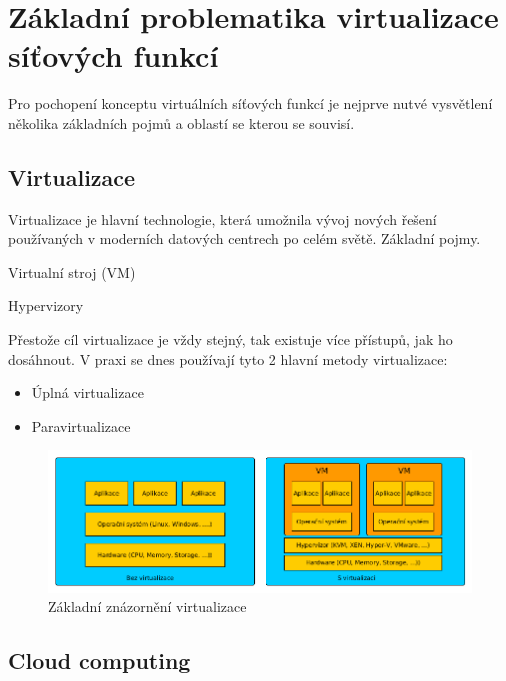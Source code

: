 \chapter{Základní problematika virtualizace síťových funkcí}

Pro pochopení konceptu virtuálních síťových funkcí je nejprve nutvé vysvětlení několika základních pojmů a oblastí se kterou se souvisí.


\section{Virtualizace}

Virtualizace je hlavní technologie, která umožnila vývoj nových řešení používaných v moderních datových centrech po celém světě. 
Základní pojmy. 

Virtualní stroj (VM)

Hypervizory

Přestože cíl virtualizace je vždy stejný, tak existuje více přístupů, jak ho dosáhnout. V praxi se dnes používají tyto 2 hlavní metody virtualizace:

\begin{itemize}

\item Úplná virtualizace

\item Paravirtualizace

\end{itemize}


\begin{figure}[h]
\begin{centering}
\includegraphics[scale=0.5]{images/virtualization}
\par\end{centering}
\caption{Základní znázornění virtualizace\label{fig:virtualization}}
\end{figure}


\section{Cloud computing}\label{sub:interaction}

